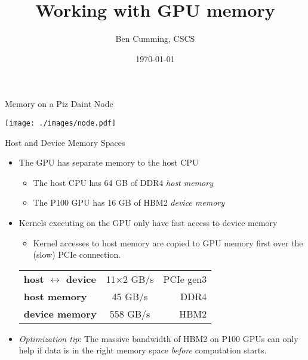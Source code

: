 \documentclass[aspectratio=43]{beamer}
\author{Ben Cumming, CSCS}
\title{Working with GPU memory}
\subtitle{}
\date{\today}
\begin{document}
\cscstitle

\begin{frame}[fragile]{Memory on a Piz Daint Node}
    \begin{center}
        \texttt{[image: ./images/node.pdf]}
    \end{center}
\end{frame}

\begin{frame}[fragile]{Host and Device Memory Spaces}
    \begin{itemize}
        \item The GPU has separate memory to the host CPU
            \begin{itemize}
                \item The host CPU has 64 GB of DDR4 \emph{host memory}
                \item The P100 GPU has 16 GB of HBM2 \emph{device memory}
            \end{itemize}
        \item Kernels executing on the GPU only have fast access to device memory
            \begin{itemize}
                \item Kernel accesses to host memory are copied to GPU memory first over the (slow) PCIe connection.
            \end{itemize}

            \begin{center}
                \begin{tabular}{lcr}
                    \textbf{host $\leftrightarrow$ device} & 11$\times$2 GB/s & PCIe gen3 \\
                    \textbf{host memory}                   & 45 GB/s  & DDR4      \\
                    \textbf{device memory}                 & 558 GB/s & HBM2
                \end{tabular}
            \end{center}

        \item \emph{Optimization tip}: The massive bandwidth of HBM2 on P100 GPUs can only help if data is in the right memory space \emph{before} computation starts.
    \end{itemize}

\end{frame}
\end{document}
